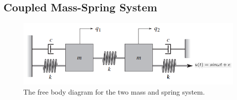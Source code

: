 \documentclass{amsart}
\theoremstyle{definition}
\theoremstyle{remark}
\numberwithin{equation}{section}
\begin{document}
\subsection{Coupled Mass-Spring System}

\begin{figure}[H]
    \centering
    \includegraphics[scale=.55]{dualMassSpringFBD.png}
    \caption{The free body diagram for the two mass and spring system.}
    \label{fig:dualMS}
\end{figure}
\end{document}

